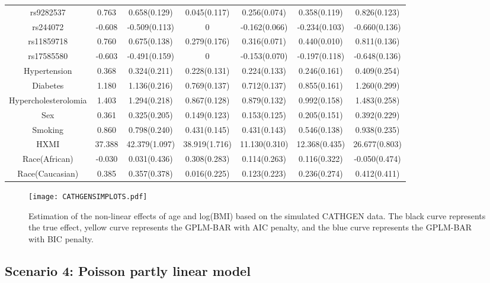 \documentclass[11pt]{article}
\begin{document}
\begin{table}[H]
{\begin{tabular}{c|c|ccccc}
    rs9282537 & 0.763 & 0.658(0.129) & 0.045(0.117) & 0.256(0.074) & 0.358(0.119) & 0.826(0.123)\\
    rs244072 & -0.608 & -0.509(0.113) & 0 & -0.162(0.066) & -0.234(0.103) & -0.660(0.136)\\
    rs11859718 & 0.760 & 0.675(0.138) & 0.279(0.176) & 0.316(0.071) & 0.440(0.010) & 0.811(0.136)\\
    rs17585580 & -0.603 & -0.491(0.159) & 0 & -0.153(0.070) & -0.197(0.118) & -0.648(0.136)\\
    Hypertension & 0.368 & 0.324(0.211) & 0.228(0.131) & 0.224(0.133) & 0.246(0.161) & 0.409(0.254)\\
    Diabetes & 1.180 & 1.136(0.216) & 0.769(0.137) & 0.712(0.137) & 0.855(0.161) & 1.260(0.299)\\
    Hypercholesterolomia & 1.403 & 1.294(0.218) & 0.867(0.128) & 0.879(0.132) & 0.992(0.158) & 1.483(0.258)\\
    Sex & 0.361 & 0.325(0.205) & 0.149(0.123) & 0.153(0.125) & 0.205(0.151) & 0.392(0.229)\\
    Smoking & 0.860 & 0.798(0.240) & 0.431(0.145) & 0.431(0.143) & 0.546(0.138) & 0.938(0.235)\\
    HXMI & 37.388 & 42.379(1.097) & 38.919(1.716) & 11.130(0.310) & 12.368(0.435) & 26.677(0.803)\\
    Race(African) & -0.030 & 0.031(0.436) & 0.308(0.283) & 0.114(0.263) & 0.116(0.322) & -0.050(0.474)\\
    Race(Caucasian) & 0.385 & 0.357(0.378) & 0.016(0.225) & 0.123(0.223) & 0.236(0.274) & 0.412(0.411)\\
    \hline
    \end{tabular}}
\end{table}

\begin{figure}
    \centering
    \texttt{[image: CATHGENSIMPLOTS.pdf]}
    \caption{Estimation of the non-linear effects of age and log(BMI) based on the simulated CATHGEN data. The black curve represents the true effect, yellow curve represents the GPLM-BAR with AIC penalty, and the blue curve represents the GPLM-BAR with BIC penalty.} \label{S3plot}
\end{figure}

\subsection*{Scenario 4: Poisson partly linear model}
\end{document}
